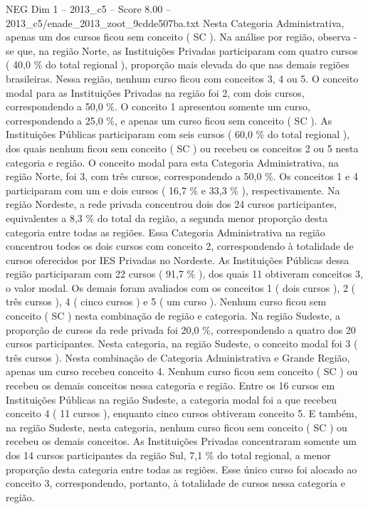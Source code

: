 \begin{textsample}{NEG Dim 1 – 2013\_c5 – Score 8.00 – 2013\_c5/enade\_2013\_zoot\_9cdde507ba.txt}
Nesta Categoria Administrativa, apenas um dos cursos ficou sem conceito ( SC ).
Na análise por região, observa -se que, na região Norte, as Instituições Privadas participaram com quatro cursos ( 40,0 \% do total regional ), proporção mais elevada do que nas demais regiões brasileiras.
Nessa região, nenhum curso ficou com conceitos 3, 4 ou 5.
O conceito modal para as Instituições Privadas na região foi 2, com dois cursos, correspondendo a 50,0 \%.
O conceito 1 apresentou somente um curso, correspondendo a 25,0 \%, e apenas um curso ficou sem conceito ( SC ).
As Instituições Públicas participaram com seis cursos ( 60,0 \% do total regional ), dos quais nenhum ficou sem conceito ( SC ) ou recebeu os conceitos 2 ou 5 nesta categoria e região.
O conceito modal para esta Categoria Administrativa, na região Norte, foi 3, com três cursos, correspondendo a 50,0 \%.
Os conceitos 1 e 4 participaram com um e dois cursos ( 16,7 \% e 33,3 \% ), respectivamente.
Na região Nordeste, a rede privada concentrou dois dos 24 cursos participantes, equivalentes a 8,3 \% do total da região, a segunda menor proporção desta categoria entre todas as regiões.
Essa Categoria Administrativa na região concentrou todos os dois cursos com conceito 2, correspondendo à totalidade de cursos oferecidos por IES Privadas no Nordeste.
As Instituições Públicas dessa região participaram com 22 cursos ( 91,7 \% ), dos quais 11 obtiveram conceitos 3, o valor modal.
Os demais foram avaliados com os conceitos 1 ( dois cursos ), 2 ( três cursos ), 4 ( cinco cursos ) e 5 ( um curso ).
Nenhum curso ficou sem conceito ( SC ) nesta combinação de região e categoria.
Na região Sudeste, a proporção de cursos da rede privada foi 20,0 \%, correspondendo a quatro dos 20 cursos participantes.
Nesta categoria, na região Sudeste, o conceito modal foi 3 ( três cursos ).
Nesta combinação de Categoria Administrativa e Grande Região, apenas um curso recebeu conceito 4.
Nenhum curso ficou sem conceito ( SC ) ou recebeu os demais conceitos nessa categoria e região.
Entre os 16 cursos em Instituições Públicas na região Sudeste, a categoria modal foi a que recebeu conceito 4 ( 11 cursos ), enquanto cinco cursos obtiveram conceito 5.
E também, na região Sudeste, nesta categoria, nenhum curso ficou sem conceito ( SC ) ou recebeu os demais conceitos.
As Instituições Privadas concentraram somente um dos 14 cursos participantes da região Sul, 7,1 \% do total regional, a menor proporção desta categoria entre todas as regiões.
Esse único curso foi alocado ao conceito 3, correspondendo, portanto, à totalidade de cursos nessa categoria e região.

\end{textsample}
